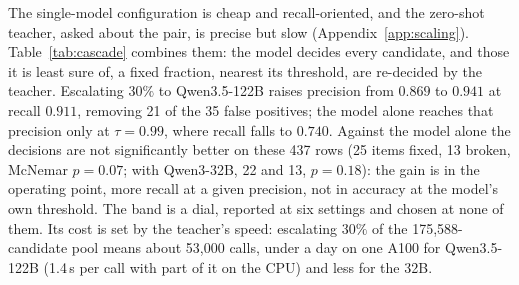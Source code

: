 \documentclass[11pt]{article}
\begin{document}
\begin{table}[t]\centering\footnotesize
\setlength{\tabcolsep}{2.6pt}
\caption{The single-model configuration with its candidate rules keeps its own decision except on the band of
candidates whose score lies nearest its threshold, which take the zero-shot teacher's answer to
the pair question; 437 rows. A rule rejection is final. Band $0\%$ is that model alone,
$100\%$ the teacher alone (with the rules).}
\label{tab:cascade}
\end{table}

The single-model configuration is cheap and recall-oriented, and the zero-shot teacher, asked about the pair, is
precise but slow (Appendix~\ref{app:scaling}). Table~\ref{tab:cascade} combines them: the model
decides every candidate, and those it is least sure of, a fixed fraction, nearest its threshold, are re-decided by the teacher. Escalating $30\%$ to Qwen3.5-122B raises precision from $0.869$
to $0.941$ at recall $0.911$, removing 21 of the 35 false positives; the model alone reaches that
precision only at $\tau = 0.99$, where recall falls to $0.740$. Against the model alone the
decisions are not significantly better on these 437 rows (25 items fixed, 13 broken,
McNemar $p = 0.07$; with Qwen3-32B, 22 and 13, $p = 0.18$): the gain is in the
operating point, more recall at a given precision, not in accuracy at the model's own threshold. The
band is a dial, reported at six settings and chosen at none of them. Its cost is set by the
teacher's speed: escalating $30\%$ of the 175{,}588-candidate pool means about 53{,}000 calls, under
a day on one A100 for Qwen3.5-122B (1.4\,s per call with part of it on the CPU) and less for the 32B.
\end{document}
